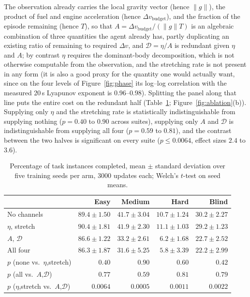\documentclass[11pt]{article}
\newcommand{\dd}{\mathcal{D}}
\begin{document}
The observation already carries the local gravity vector (hence
$\lVert g \rVert$), the product of fuel and engine acceleration (hence
$\Delta v_{\mathrm{budget}}$), and the fraction of the episode remaining
(hence $T$), so that $A = \Delta v_{\mathrm{budget}} / (\lVert g \rVert T)$ is
an algebraic combination of three quantities the agent already has, partly
duplicating an existing ratio of remaining to required $\Delta v$, and
$\dd = \eta / A$ is redundant given $\eta$ and $A$; by contrast $\eta$
requires the dominant-body decomposition, which is not otherwise computable
from the observation, and the stretching rate is not present in any form
(it is also a good proxy for the quantity one would actually want, since on
the four levels of Figure~\ref{fig:phase} its log–log correlation with the
measured 20\,s Lyapunov exponent is $0.96$--$0.98$).
Splitting the panel along that line puts the entire cost on the redundant
half (Table~\ref{tab:instr}; Figure~\ref{fig:ablation}(b)). Supplying only
$\eta$ and the stretching rate is statistically indistinguishable from
supplying nothing ($p = 0.40$ to $0.90$ across suites), supplying only $A$
and $\dd$ is indistinguishable from supplying all four ($p = 0.59$ to
$0.81$), and the contrast between the two halves is significant on every
suite ($p \le 0.0064$, effect sizes $2.4$ to $3.6$).

\begin{table}[t]
\centering
\small
\begin{tabular}{lrrrr}
\toprule
& Easy & Medium & Hard & Blind \\
\midrule
No channels      & $89.4 \pm 1.50$ & $41.7 \pm 3.04$ & $10.7 \pm 1.24$ & $30.2 \pm 2.27$ \\
$\eta$, stretch  & $90.4 \pm 1.81$ & $41.9 \pm 2.30$ & $11.1 \pm 1.03$ & $29.2 \pm 1.23$ \\
$A$, $\dd$       & $86.6 \pm 1.22$ & $33.2 \pm 2.61$ & $6.2 \pm 1.68$  & $22.7 \pm 2.52$ \\
All four         & $86.3 \pm 1.87$ & $31.6 \pm 5.25$ & $5.8 \pm 3.39$  & $22.2 \pm 2.99$ \\
\midrule
$p$ (none vs.\ $\eta$,stretch)   & $0.40$ & $0.90$ & $0.60$ & $0.42$ \\
$p$ (all vs.\ $A$,$\dd$)         & $0.77$ & $0.59$ & $0.81$ & $0.79$ \\
$p$ ($\eta$,stretch vs.\ $A$,$\dd$) & $0.0064$ & $0.0005$ & $0.0011$ & $0.0022$ \\
\bottomrule
\end{tabular}
\caption{Percentage of task instances completed, mean $\pm$ standard
deviation over five training seeds per arm, 3000 updates each; Welch's
$t$-test on seed means.}
\label{tab:instr}
\end{table}
\end{document}
